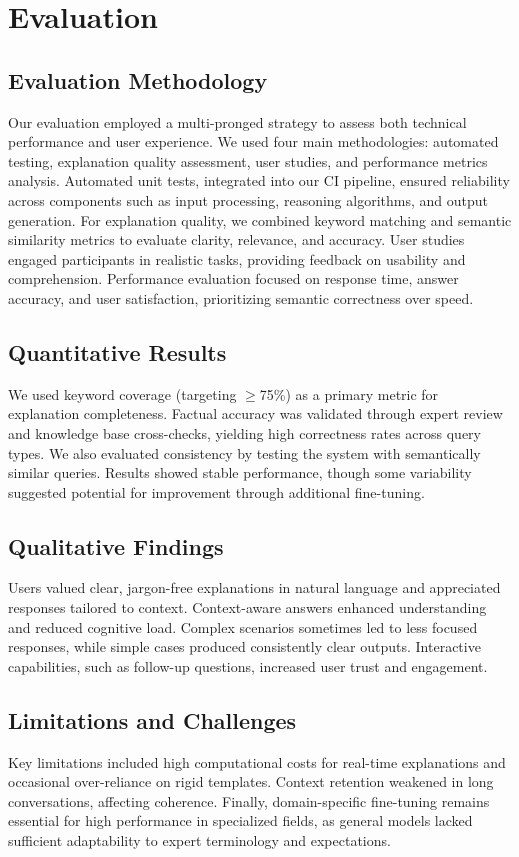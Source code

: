 \section{Evaluation}

\subsection{Evaluation Methodology}

Our evaluation employed a multi-pronged strategy to assess both technical performance and user experience. We used four main methodologies: automated testing, explanation quality assessment, user studies, and performance metrics analysis.
Automated unit tests, integrated into our CI pipeline, ensured reliability across components such as input processing, reasoning algorithms, and output generation. For explanation quality, we combined keyword matching and semantic similarity metrics to evaluate clarity, relevance, and accuracy.
User studies engaged participants in realistic tasks, providing feedback on usability and comprehension. Performance evaluation focused on response time, answer accuracy, and user satisfaction, prioritizing semantic correctness over speed.

\subsection{Quantitative Results}
We used keyword coverage (targeting $\geq$75\%) as a primary metric for explanation completeness. Factual accuracy was validated through expert review and knowledge base cross-checks, yielding high correctness rates across query types.
We also evaluated consistency by testing the system with semantically similar queries. Results showed stable performance, though some variability suggested potential for improvement through additional fine-tuning.
\subsection{Qualitative Findings}

Users valued clear, jargon-free explanations in natural language and appreciated responses tailored to context. Context-aware answers enhanced understanding and reduced cognitive load.
Complex scenarios sometimes led to less focused responses, while simple cases produced consistently clear outputs. Interactive capabilities, such as follow-up questions, increased user trust and engagement.

\subsection{Limitations and Challenges}

Key limitations included high computational costs for real-time explanations and occasional over-reliance on rigid templates. Context retention weakened in long conversations, affecting coherence.
Finally, domain-specific fine-tuning remains essential for high performance in specialized fields, as general models lacked sufficient adaptability to expert terminology and expectations.
